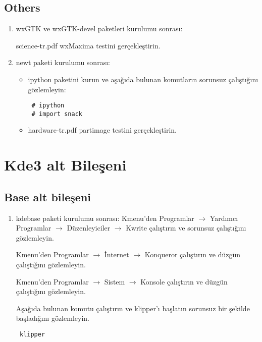 \documentclass[a4paper,10pt]{article}
\begin{document}
\subsection*{Others}
\begin{enumerate}
\item wxGTK ve wxGTK-devel paketleri kurulumu sonrası:

science-tr.pdf wxMaxima testini gerçekleştirin.

 \item newt paketi kurulumu sonrası:
\begin{itemize}
 \item ipython paketini kurun ve aşağıda bulunan komutların sorunsuz çalıştığını gözlemleyin:
\begin{verbatim}
 # ipython
 # import snack
\end{verbatim}
  \item hardware-tr.pdf partimage testini gerçekleştirin.

\end{itemize}
 


\end{enumerate}

\section{Kde3 alt Bileşeni}
\subsection*{Base alt bileşeni}
\begin{enumerate}
 \item kdebase paketi kurulumu sonrası:
Kmenu'den Programlar $\rightarrow$ Yardımcı Programlar $\rightarrow$ Düzenleyiciler $\rightarrow$ Kwrite çalıştırın ve sorunsuz çalıştığını gözlemleyin.

Kmenu'den Programlar $\rightarrow$ İnternet $\rightarrow$ Konqueror çalıştırın ve düzgün çalıştığını gözlemleyin.

Kmenu'den Programlar $\rightarrow$ Sistem $\rightarrow$ Konsole çalıştırın ve düzgün çalıştığını gözlemleyin.

Aşağıda bulunan komutu çalıştırın ve klipper'ı başlatın sorunsuz bir şekilde başladığını gözlemleyin.

\begin{verbatim}
 klipper
\end{verbatim}

\end{enumerate}
\end{document}
